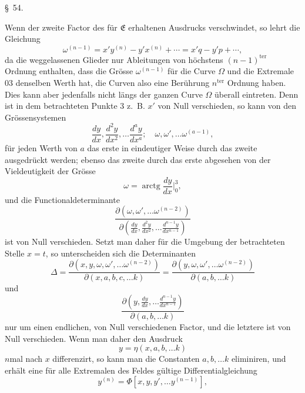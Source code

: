 \documentclass[11pt,a4paper,leqno]{article}
\begin{document}
\begin{center}
{\large \S~54.}
\end{center}

Wenn der zweite Factor des für $\mathfrak{E}$ erhaltenen Ausdrucks verschwindet, so lehrt die Gleichung
\[
\omega^{(n-1)}=x'y^{(n)}-y'x^{(n)}+\cdots=x'q-y'p+\cdots,
\]
da die weggelassenen Glieder nur Ableitungen von höchstens $(n-1)^{\mathrm{ter}}$ Ordnung enthalten, dass die Grösse $\omega^{(n-1)}$ für die Curve $\Omega$ und die Extremale 03 denselben Werth hat, die Curven also eine Berührung $n^{\mathrm{ter}}$ Ordnung haben. Dies kann aber jedenfalls nicht längs der ganzen Curve $\Omega$ überall eintreten. Denn ist in dem betrachteten Punkte 3 z.~B. $x'$ von Null verschieden, so kann von den Grössensystemen
\begin{equation}\tag{41}
\frac{dy}{dx},\frac{d^2y}{dx^2},\ldots\frac{d^ay}{dx^a};
\quad \omega,\omega',\ldots\omega^{(a-1)},
\end{equation}
für jeden Werth von $a$ das erste in eindeutiger Weise durch das zweite ausgedrückt werden; ebenso das zweite durch das erste abgesehen von der Vieldeutigkeit der Grösse
\[
\omega=\operatorname{arctg}\frac{dy}{dx}\bigg|_0^3,
\]
und die Functionaldeterminante
\[
\frac{\partial(\omega,\omega',\ldots\omega^{(n-2)})}
{\partial\left(\frac{dy}{dx},\frac{d^2y}{dx^2},\ldots\frac{d^{n-1}y}{dx^{n-1}}\right)}
\]
ist von Null verschieden. Setzt man daher für die Umgebung der betrachteten Stelle $x=t$, so unterscheiden sich die Determinanten
\[
\Delta=
\frac{\partial(x,y,\omega,\omega',\ldots\omega^{(n-2)})}
{\partial(x,a,b,c,\ldots k)}
=
\frac{\partial(y,\omega,\omega',\ldots\omega^{(n-2)})}
{\partial(a,b,\ldots k)}
\]
und
\[
\frac{\partial\left(y,\frac{dy}{dx},\ldots\frac{d^{n-1}y}{dx^{n-1}}\right)}
{\partial(a,b,\ldots k)}
\]
nur um einen endlichen, von Null verschiedenen Factor, und die letztere ist von Null verschieden. Wenn man daher den Ausdruck
\[
y=\eta(x,a,b,\ldots k)
\]
$n$mal nach $x$ differenzirt, so kann man die Constanten $a,b,\ldots k$ eliminiren, und erhält eine für alle Extremalen des Feldes gültige Differentialgleichung
\begin{equation}\tag{42}
y^{(n)}=\Phi[x,y,y',\ldots y^{(n-1)}],
\end{equation}
\end{document}
